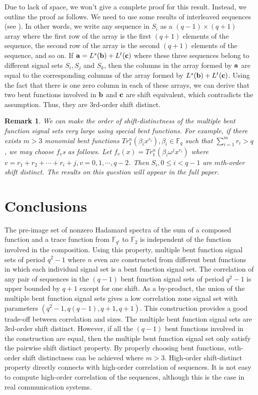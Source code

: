 \documentclass{article}
\newtheorem{remark}{Remark}
\newcommand{\F}{\ensuremath{\mathbb F}}
\newcommand{\abu}{{\bf{a}}}
\newcommand{\bbu}{{\bf{b}}}
\newcommand{\cbu}{{\bf{c}}}
\begin{document}
Due to lack of space, we won't give a complete proof for this result. Instead, we outline the proof as follows.  We  need to use some results of  interleaved sequences (see \cite{GongIS95}\cite{GongIS02}\cite{Paterson}). In other words, we  write any sequence in $S_i$  as  a $(q-1)\times (q+1)$ array where the first row of the array  is the first $(q+1)$ elements of the sequence, the second row of the array is the second $(q+1)$ elements of the sequence, and so on.  If $\abu = L^s(\bbu)+L^t(\cbu)$ where these three sequences belong to different signal sets $S_i, S_j$ and $S_k$, then the  columns in the array formed by $\abu$ are equal to the corresponding columns of  the array formed by $L^s(\bbu)+L^t(\cbu)$.  Using the fact that there is  one zero column in each of these arrays,  we can derive that two bent functions  involved in $\bbu$ and $\cbu$ are  shift equivalent, which contradicts the assumption.  Thus, they are 3rd-order shift distinct. 

\begin{remark}
We can make the order of shift-distinctness of the multiple bent function signal sets very large using special bent functions. For example, if there exists $m>3$   monomial bent functions $Tr_1^n(\beta_i x^{r_i}), \beta_i \in \F_q$ such that $\sum_{i=1}^m  r_i>q$, we may choose $f_v$s as follows. Let $f_v(x) = Tr_1^n(\beta_i \omega^j x^{r_i})$ where  $v=r_1+r_2+\cdots +r_i +j, v=0, 1, \cdots,  q-2$.   Then $S_i, 0\le i<q-1$ are $m$th-order shift distinct.   The results on this question  will appear in the full paper. 
\end{remark}
\section{Conclusions}
  The pre-image set of nonzero Hadamard spectra of  the sum of a  composed function  and a trace  function from $\F_{q^l}$ to $\F_2$   is independent of  the function involved in the composition.     Using this property,  multiple bent function signal sets  of period $q^2-1$ where $n$ even are constructed from  different bent functions in which each individual signal set is a bent function signal set. The  correlation of any pair of sequences in the $(q-1)$  bent function signal sets  of period $q^2-1$ is upper bounded by $q+1$ except for  one shift.   As a by-product, the union of the multiple bent function signal sets gives a  low correlation zone signal set with  parameters $(q^2-1, q(q-1), q+1, q+1)$.  This construction provides a good trade-off between correlation and sizes.  The multiple bent function signal sets are 3rd-order shift distinct. However,  if  all the $(q-1)$  bent functions involved in the construction are equal, then the multiple bent function signal set only satisfy the pairwise shift distinct property.  By properly choosing bent functions,  $m$th-order shift distinctness  can be achieved where $m>3$.  High-order shift-distinct property directly connects with high-order correlation of sequences.   It is not easy to compute high-order correlation of the sequences, although this is the case in real communication systems. 
\end{document}
